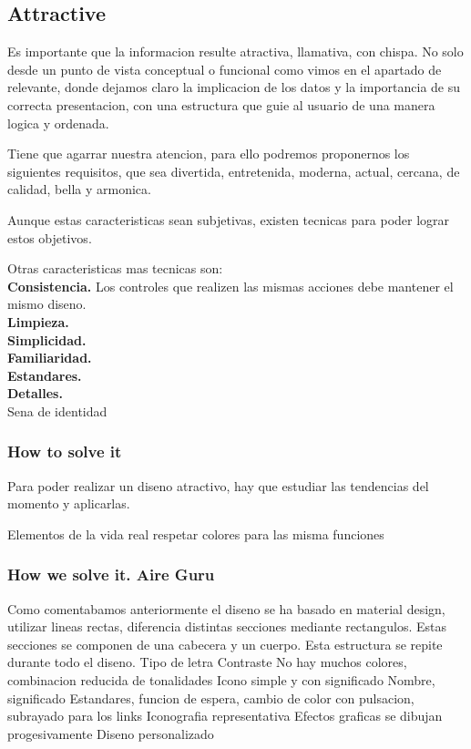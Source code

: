 \subsection{Attractive}
Es importante que la informacion resulte atractiva, llamativa, con chispa. No solo desde un punto de vista conceptual
o funcional como vimos en el apartado de relevante, donde dejamos claro la implicacion de los datos y la importancia
de su correcta presentacion, con una estructura que guie al usuario de una manera logica y ordenada.

Tiene que agarrar nuestra atencion, para ello podremos proponernos los siguientes requisitos, que sea divertida, entretenida,
moderna, actual, cercana, de calidad, bella y armonica.

Aunque estas caracteristicas sean subjetivas, existen tecnicas para poder lograr estos objetivos.

Otras caracteristicas mas tecnicas son:\\
 
\textbf{Consistencia.} Los controles que realizen las mismas acciones debe mantener el mismo diseno.\\

\textbf{Limpieza.} \\

\textbf{Simplicidad.} \\

\textbf{Familiaridad.} \\

\textbf{Estandares.} \\

\textbf{Detalles.} \\

Sena de identidad

\subsubsection{How to solve it} 
Para poder realizar un diseno atractivo, hay que estudiar las tendencias del momento y aplicarlas. 

Elementos de la vida real
respetar colores para las misma funciones
\subsubsection{How we solve it. Aire Guru} 
Como comentabamos anteriormente el diseno se ha basado en material design, utilizar lineas rectas, diferencia
distintas secciones mediante rectangulos. Estas secciones se componen de una cabecera y un cuerpo. Esta estructura
se repite durante todo el diseno.
Tipo de letra
Contraste
No hay muchos colores, combinacion reducida de tonalidades
Icono simple y con significado
Nombre, significado
Estandares, funcion de espera, cambio de color con pulsacion, subrayado para los links
Iconografia representativa
Efectos graficas se dibujan progesivamente
Diseno personalizado

